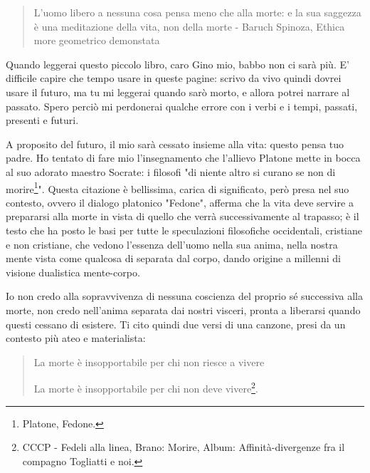 \begin{quotation}
	\small L'uomo libero a nessuna cosa pensa meno che alla morte: e la sua saggezza è una meditazione della vita, non della morte - Baruch Spinoza, Ethica more geometrico demonstata
\end{quotation}

Quando leggerai questo piccolo libro, caro Gino mio, babbo non ci sarà più. E' difficile capire che tempo usare in queste pagine: scrivo da vivo quindi dovrei usare il futuro, ma tu mi leggerai quando sarò morto, e allora potrei narrare al passato. Spero perciò mi perdonerai qualche errore con i verbi e i tempi, passati, presenti e futuri.

A proposito del futuro, il mio sarà cessato insieme alla vita: questo pensa tuo padre. Ho tentato di fare mio l'insegnamento che l'allievo Platone mette in bocca al suo adorato maestro Socrate: i filosofi "di niente altro si curano se non di morire\footnote{Platone, Fedone.}". Questa citazione è bellissima, carica di significato, però presa nel suo contesto, ovvero il dialogo platonico "Fedone", afferma che la vita deve servire a prepararsi alla morte in vista di quello che verrà successivamente al trapasso; è il testo che ha posto le basi per tutte le speculazioni filosofiche occidentali, cristiane e non cristiane, che vedono l'essenza dell'uomo nella sua anima, nella nostra mente vista come qualcosa di separata dal corpo, dando origine a millenni di visione dualistica mente-corpo. 

Io non credo alla sopravvivenza di nessuna coscienza del proprio sé successiva alla morte, non credo nell'anima separata dai nostri visceri, pronta a liberarsi quando questi cessano di esistere. Ti cito quindi due versi di una canzone, presi da un contesto più ateo e materialista:

\begin{quotation}
	\small La morte è insopportabile per chi non riesce a vivere
	
	La morte è insopportabile per chi non deve vivere\footnote{CCCP - Fedeli alla linea, Brano: Morire, Album: Affinità-divergenze fra il compagno Togliatti e noi. }.
\end{quotation}
